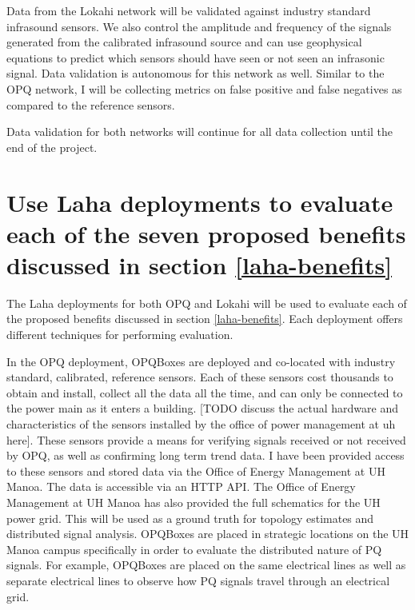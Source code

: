 Data from the Lokahi network will be validated against industry standard infrasound sensors. We also control the amplitude and frequency of the signals generated from the calibrated infrasound source and can use geophysical equations to predict which sensors should have seen or not seen an infrasonic signal. Data validation is autonomous for this network as well. Similar to the OPQ network, I will be collecting metrics on false positive and false negatives as compared to the reference sensors. 

Data validation for both networks will continue for all data collection until the end of the project.

\section{Use Laha deployments to evaluate each of the seven proposed benefits discussed in section \ref{laha-benefits}}
The Laha deployments for both OPQ and Lokahi will be used to evaluate each of the proposed benefits discussed in section \ref{laha-benefits}. Each deployment offers different techniques for performing evaluation. 

In the OPQ deployment, OPQBoxes are deployed and co-located with industry standard, calibrated, reference sensors. Each of these sensors cost thousands to obtain and install, collect all the data all the time, and can only be connected to the power main as it enters a building. [TODO discuss the actual hardware and characteristics of the sensors installed by the office of power management at uh here]. These sensors provide a means for verifying signals received or not received by OPQ, as well as confirming long term trend data. I have been provided access to these sensors and stored data via the Office of Energy Management at UH Manoa. The data is accessible via an HTTP API. The Office of Energy Management at UH Manoa has also provided the full schematics for the UH power grid. This will be used as a ground truth for topology estimates and distributed signal analysis. OPQBoxes are placed in strategic locations on the UH Manoa campus specifically in order to evaluate the distributed nature of PQ signals. For example, OPQBoxes are placed on the same electrical lines as well as separate electrical lines to observe how PQ signals travel through an electrical grid.

